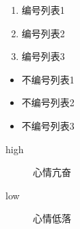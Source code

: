 \documentclass{article}
\begin{document}
  \begin{enumerate}
    \item 编号列表1
    \item 编号列表2
    \item 编号列表3
  \end{enumerate}
  \begin{itemize}
    \item 不编号列表1
    \item 不编号列表2
    \item 不编号列表3
  \end{itemize}
  \begin{description}
    \item[high] 心情亢奋
    \item[low] 心情低落
  \end{description}
\end{document}

